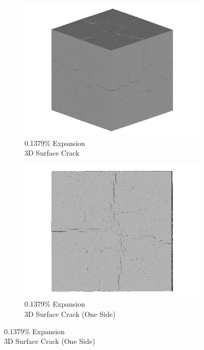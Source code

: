 \begin{figure}[ht!]
\centering
    \begin{subfigure}{.5\textwidth}
      \centering
      \includegraphics[width=0.5\linewidth]{Files/exp_3D/DEF/A30X0C_1_3d.png}
      \caption{0.1379\% Expansion\\3D Surface Crack}
    \end{subfigure}%
    \begin{subfigure}{.5\textwidth}
      \centering
      \includegraphics[width=0.5\linewidth]{Files/exp_3D/DEF/A30X0C_1_3ds.png}
      \caption{0.1379\% Expansion\\3D Surface Crack (One Side)}
    \end{subfigure}%


\end{figure}
